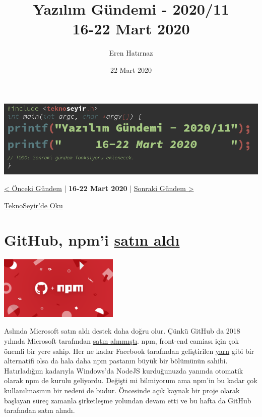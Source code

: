 \documentclass[11pt]{article}
\author{Eren Hatırnaz}
\date{22 Mart 2020}
\title{Yazılım Gündemi - 2020/11\\\medskip
\large 16-22 Mart 2020}
\begin{document}
\maketitle
\tableofcontents \clearpage\shorthandoff{=}

\begin{center}
\includegraphics[width=.9\linewidth]{gorseller/yazilim-gundemi-banner.png}
\end{center}

\begin{center}
\href{../10/yazilim-gundemi-2020-10.pdf}{< Önceki Gündem} | \textbf{16-22 Mart 2020} | \href{../12/yazilim-gundemi-2020-12.pdf}{Sonraki Gündem >}

\href{https://teknoseyir.com/blog/yazilim-gundemi-2020-11}{TeknoSeyir'de Oku}
\end{center}

\section{GitHub, npm'i \href{https://github.blog/2020-03-16-npm-is-joining-github/}{satın aldı}}
\label{sec:orgc8c512f}
\begin{center}
\includegraphics[height=3cm]{gorseller/github-npm.png}
\end{center}

Aslında Microsoft satın aldı destek daha doğru olur. Çünkü GitHub da 2018
yılında Microsoft tarafından \href{https://techcrunch.com/2018/06/04/microsoft-has-acquired-github-for-7-5b-in-microsoft-stock/}{satın alınmıştı}. npm, front-end camiası için çok
önemli bir yere sahip. Her ne kadar Facebook tarafından geliştirilen \href{https://classic.yarnpkg.com/en/}{yarn} gibi
bir alternatifi olsa da hala daha npm pastanın büyük bir bölümünün sahibi.
Hatırladığım kadarıyla Windows'da NodeJS kurduğunuzda yanında otomatik olarak
npm de kurulu geliyordu. Değişti mi bilmiyorum ama npm'in bu kadar çok
kullanılmasının bir nedeni de budur. Öncesinde açık kaynak bir proje olarak
başlayan süreç zamanla şirketleşme yolundan devam etti ve bu hafta da GitHub
tarafından satın alındı.
\end{document}
